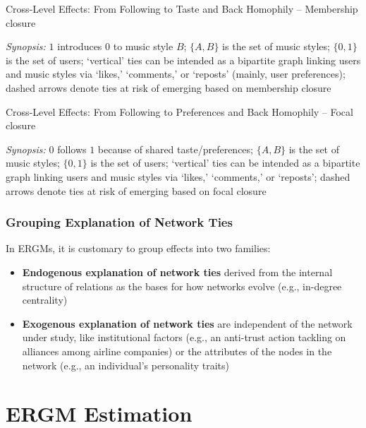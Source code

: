 \documentclass[show notes, aspectratio=1610]{beamer}
\begin{document}
\begin{frame}{Cross-Level Effects: From Following to Taste and Back}
	{Homophily -- Membership closure}
	\centering
	

	\raggedright
	\small 
	\textit{Synopsis:} $1$ introduces $0$ to music style $B$;
        $\{A, B\}$ is the set of music styles; $\{0, 1\}$ is
	the set of users; `vertical' ties can be intended as a bipartite 
	graph linking users and music styles via `likes,' `comments,' or
	`reposts' (mainly, user preferences); dashed arrows denote ties 
	at risk of emerging based on membership closure
\end{frame}

\begin{frame}{Cross-Level Effects: From Following to Preferences and Back}
	{Homophily -- Focal closure}
	\centering
	

	\raggedright
	\small
	\textit{Synopsis:} $0$ follows $1$ because of shared taste/preferences; 
	$\{A, B\}$ is the set of music styles; $\{0, 1\}$ is
	the set of users; `vertical' ties can be intended as a bipartite 
	graph linking users and music styles via `likes,' `comments,' or
	`reposts'; dashed arrows denote ties at risk of emerging based on 
	focal closure 
\end{frame}

\begin{frame}
\frametitle{Grouping Explanation of Network Ties}
In ERGMs, it is customary to group effects into two families:
\begin{itemize}
  \item \textbf{Endogenous explanation of network ties} derived from the 
    internal structure of relations as the bases for how networks evolve 
    (e.g., in-degree centrality)
  \item \textbf{Exogenous explanation of network ties} are independent of the 
    network under study, like institutional factors (e.g., an anti-trust action 
    tackling on alliances among airline companies) or the attributes of the 
    nodes in the network (e.g., an individual's personality traits)
\end{itemize}
\end{frame}

\section{ERGM Estimation}
\end{document}
